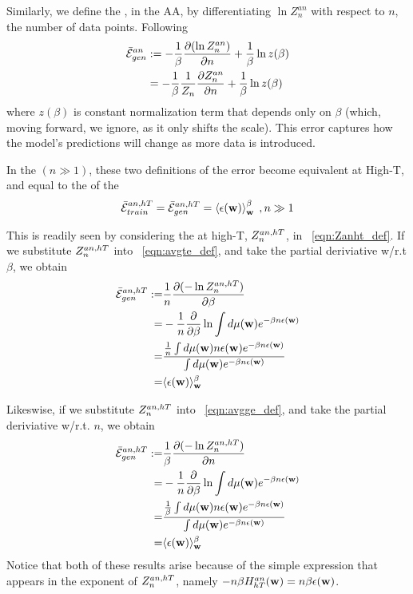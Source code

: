Similarly, 
we define the \emph{\AverageGeneralizationError}, in the AA,
by differentiating $\ln Z^{an}_{n}$ with respect to $n$, the number of data points.
Following 
\begin{align}
  \label{eqn:avgge_def}
  \bar{\mathcal{E}}_{gen}^{an}
&  := -\frac{1}{\beta}\dfrac{\partial (\ln Z^{an}_{n})}{\partial n}    +\frac{1}{\beta}\ln z(\beta)  \\ \nonumber
&  =  -\frac{1}{\beta}\frac{1}{Z_{n}}\dfrac{\partial Z^{an}_{n}}{\partial n}
  +\frac{1}{\beta}\ln z(\beta) 
\end{align}
where $z(\beta)$ is constant normalization term that depends only on $\beta$ (which, moving forward, we ignore, as it only shifts the scale).
This error captures how the model’s predictions will change as more data is introduced.

In the \ThermodynamicLimit $(n \gg 1)$, these two definitions of the error become equivalent at High-T,
and equal to the \ThermalAverage of the \EffectivePotential
\begin{align}
  \bar{\mathcal{E}}_{train}^{an, hT} = \bar{\mathcal{E}}_{gen}^{an, hT} = \left\langle \epsilon({\mathbf{w}}) \right\rangle_{\mathbf w}^{\beta}\;,n\gg 1
\end{align}

This is readily seen by considering the \Annealed \PartitionFunction at high-T, $Z^{an,hT}_{n}$, in \EQN~\ref{eqn:Zanht_def}.
If we substitute $Z^{an,hT}_{n}$ into \EQN~\ref{eqn:avgte_def}, and take the partial deriviative w/r.t $\beta$, we obtain
\begin{align}
  \label{eqn:avgte_anhT}
  \bar{\mathcal{E}}_{gen}^{an, hT} :=&\frac{1}{n}\dfrac{\partial (-\ln Z^{an,hT}_{n})}{\partial \beta}  \\ \nonumber
   =& - \dfrac{1}{n}\dfrac{\partial}{\partial \beta}\ln\int d\mu({\mathbf{w}})e^{-\beta n\epsilon({\mathbf{w}})} \\  \nonumber
   =&  \dfrac{
              \tfrac{1}{n}  \int  d\mu({\mathbf{w}}) n\epsilon({\mathbf{w}}) e^{-\beta n\epsilon({\mathbf{w}})} 
             }{
              \int  d\mu({\mathbf{w}}) e^{-\beta n\epsilon({\mathbf{w}})} 
   } \\ \nonumber
   =&\langle\epsilon({\mathbf{w}}) \rangle_{{\mathbf{w}}}^{\beta}
  \end{align}


Likeswise, if we substitute $Z^{an,hT}_{n}$ into \EQN~\ref{eqn:avgge_def}, and take the partial deriviative w/r.t. $n$, we obtain
\begin{align}
  \label{eqn:avgte_anhT}
    \bar{\mathcal{E}}_{gen}^{an, hT}  :=& \frac{1}{\beta}\dfrac{\partial (-\ln Z^{an,hT}_{n})}{\partial n} \\ \nonumber
    =& - \dfrac{1}{n}\dfrac{\partial}{\partial \beta}\ln\int d\mu({\mathbf{w}})e^{-\beta n\epsilon({\mathbf{w}})} \\  \nonumber
   =&  \dfrac{
              \tfrac{1}{\beta}  \int  d\mu({\mathbf{w}}) n\epsilon({\mathbf{w}}) e^{-\beta n\epsilon({\mathbf{w}})} 
             }{
     \int  d\mu({\mathbf{w}}) e^{-\beta n\epsilon({\mathbf{w}})} 
   } \\ \nonumber
   =&\langle\epsilon({\mathbf{w}}) \rangle_{{\mathbf{w}}}^{\beta}
  \end{align}
  Notice that both of these results arise
  because of the simple expression that appears in the exponent of $Z^{an,hT}_{n}$, namely $-n\beta H^{an}_{hT}({\mathbf{w}})=n\beta\epsilon({\mathbf{w}})$.


